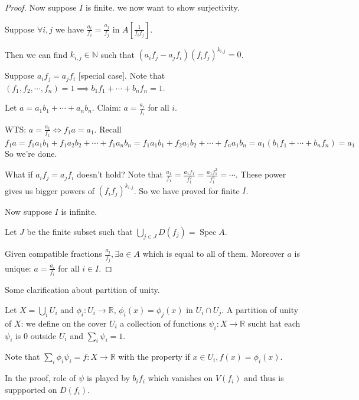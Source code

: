\documentclass{article}
\theoremstyle{definition}
\begin{document}
\begin{proof}
        Now suppose \(I\) is finite. we now want to show surjectivity.

        Suppose \(\forall i,j\) we have \(\frac{a_i}{f_i} = \frac{a_j}{f_j}\) in \(A \left[ \frac{1}{f_i f_j} \right] \).

        Then we can find \(k_{i,j}\in\mathbb{N}\) such that \((a_i f_j - a_j f_i) (f_i f_j)^{k_{i,j}} = 0\).
        
        Suppose \(a_i f_j = a_j f_i\) [special case]. Note that \((f_1, f_2, \cdots , f_n) = 1 \implies b_1 f_1 + \cdots +b_n f_n = 1\).

        Let \(a = a_1 b_1 + \cdots + a_n b_n\). Claim: \(a = \frac{a_i}{f_i}\) for all \(i\).

        WTS: \(a = \frac{a_1}{f_1} \iff f_1 a = a_1\). Recall \(f_1 a = f_1 a_1 b_1 + f_1 a_2 b_2 + \cdots + f_1 a_n b_n = f_1 a_1 b_1 + f_2 a_1 b_2 + \cdots + f_n a_1 b_n = a_1(b_1 f_1 + \cdots + b_n f_n) = a_1\) So we're done.
        
        What if \(a_i f_j = a_j f_i\) doesn't hold? Note that \(\frac{a_1}{f_1}= \frac{a_1 f_1}{f_1^2} = \frac{a_1 f_1^2}{f_1^3} = \cdots\). These power gives us bigger powers of \((f_i f_j)^{k_{i,j}}\). So we have proved for finite \(I\).
        
        Now suppose \(I\) is infinite.

        Let \(J\) be the finite subset such that \(\bigcup_{j\in J} D(f_j) = \operatorname{Spec} A\).

        Given compatible fractions \(\frac{a_j}{f_j}, \exists a\in A\) which is equal to all of them. Moreover \(a\) is unique: \(a = \frac{a_i}{f_i}\) for all \(i\in I\). 

    \end{proof}

    Some clarification about partition of unity.

    Let \(X = \bigcup_i U_i\) and \(\phi_i: U_i \to \mathbb{R}\), \(\phi_i(x)=\phi_j(x)\) in \(U_i \cap U_j\). A partition of unity of \(X\): we define on the cover \(U_i\) a collection of functions \(\psi_i: X \to \mathbb{R}\) sucht hat each \(\psi_i\) is \(0\) outside \(U_i\) and \(\sum_{i} \psi_i = 1\).

    Note that \(\sum_{i} \phi_i \psi_i = f: X \to \mathbb{R}\) with the property if \(x\in U_i, f(x) = \phi_i(x)\).

    In the proof, role of \(\psi\) is played by \(b_i f_i\) which vanishes on \(V(f_i)\) and thus is suppported on \(D(f_i)\).
\end{document}
